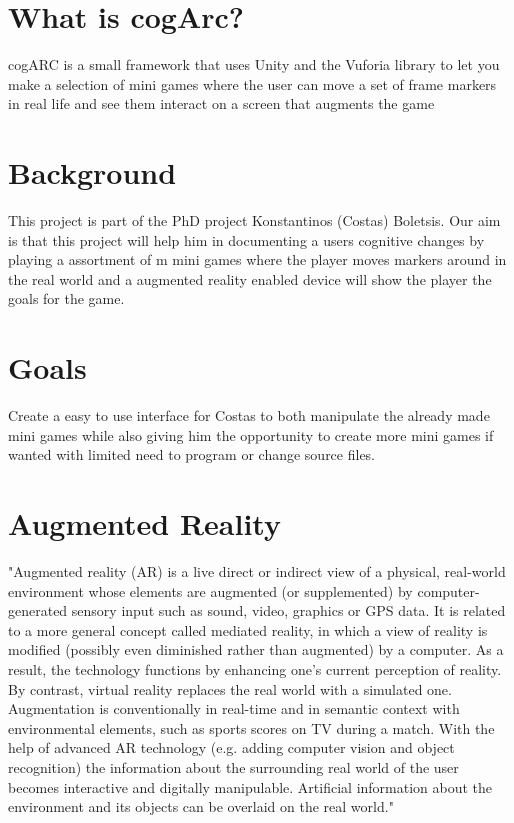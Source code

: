 \section{What is cogArc?}
cogARC is a small framework that uses Unity and the Vuforia library to let you make a selection of mini games where the user can move a set of frame markers in real life and see them interact on a screen that augments the game

\section{Background}
This project is part of the PhD project Konstantinos (Costas) Boletsis. Our aim is that this project will help him in documenting a users cognitive changes by playing a assortment of m mini games where the player moves markers around in the real world and a augmented reality enabled device will show the player the goals for the game.

\section{Goals}
Create a easy to use interface for Costas to both manipulate the already made mini games while also giving him the opportunity to create more mini games if wanted with limited need to program or change source files.

\section{Augmented Reality}
"Augmented reality (AR) is a live direct or indirect view of a physical, real-world environment whose elements are augmented (or supplemented) by computer-generated sensory input such as sound, video, graphics or GPS data. It is related to a more general concept called mediated reality, in which a view of reality is modified (possibly even diminished rather than augmented) by a computer. As a result, the technology functions by enhancing one’s current perception of reality. By contrast, virtual reality replaces the real world with a simulated one. Augmentation is conventionally in real-time and in semantic context with environmental elements, such as sports scores on TV during a match. With the help of advanced AR technology (e.g. adding computer vision and object recognition) the information about the surrounding real world of the user becomes interactive and digitally manipulable. Artificial information about the environment and its objects can be overlaid on the real world."\cite{WikiAugmentedReality}
